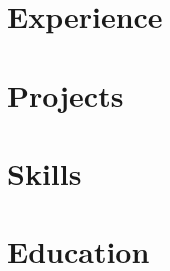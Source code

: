 \documentclass[11pt, letterpaper]{resume}
\let\\\relax %
\begin{document}
\makeprofile

\begin{paracol}{2}






\section*{Experience}


\bigskip


\section*{Projects}


\switchcolumn %


\section*{Skills}


\bigskip


\section*{Education}
\begin{supertabular}{rl}


\end{supertabular}
\end{paracol}
\end{document}
